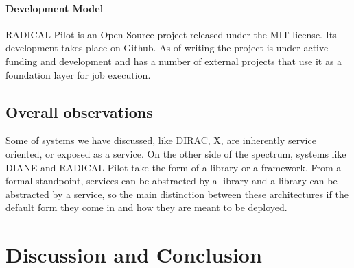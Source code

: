 \documentclass{sig-alternate}
\begin{document}
\paragraph{Development Model}

RADICAL-Pilot is an Open Source project released under the MIT license.
Its development takes place on Github.
As of writing the project is under active funding and development and has a
number of external projects that use it as a foundation layer for job
execution.

%
%
\subsection{Overall observations}


Some of systems we have discussed, like DIRAC, X, are inherently service
oriented, or exposed as a service.
On the other side of the spectrum, systems like DIANE and RADICAL-Pilot take
the form of a library or a framework.
From a formal standpoint, services can be abstracted by a library and a library
can be abstracted by a service, so the main distinction between these
architectures if the default form they come in and how they are meant to be
deployed.

\section{Discussion and Conclusion}
\label{sec:5}

\end{document}
